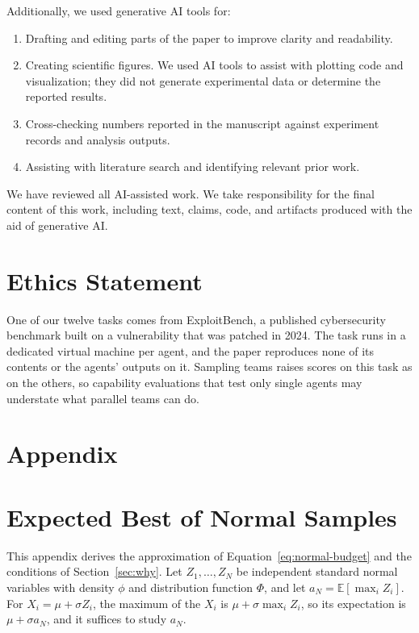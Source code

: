 \documentclass[numbers,10pt]{arxiv}
\begin{document}
Additionally, we used generative AI tools for:
\begin{enumerate}
    \item Drafting and editing parts of the paper to improve clarity and readability.
    \item Creating scientific figures. We used AI tools to assist with plotting code and visualization; they did not generate experimental data or determine the reported results.
    \item Cross-checking numbers reported in the manuscript against experiment records and analysis outputs.
    \item Assisting with literature search and identifying relevant prior work.
\end{enumerate}

We have reviewed all AI-assisted work. We take responsibility for the final content of this work, including text, claims, code, and artifacts produced with the aid of generative AI.

\section*{Ethics Statement}
One of our twelve tasks comes from ExploitBench, a published cybersecurity benchmark built on a vulnerability that was patched in 2024. The task runs in a dedicated virtual machine per agent, and the paper reproduces none of its contents or the agents' outputs on it. Sampling teams raises scores on this task as on the others, so capability evaluations that test only single agents may understate what parallel teams can do.

\FloatBarrier



\clearpage
\appendix
\section*{\Large Appendix}
\section{Expected Best of Normal Samples}
\label{app:normal}
This appendix derives the approximation of Equation~\ref{eq:normal-budget} and the conditions of Section~\ref{sec:why}. Let $Z_1,\dots,Z_N$ be independent standard normal variables with density $\phi$ and distribution function $\Phi$, and let $a_N=\mathbb{E}[\max_i Z_i]$. For $X_i=\mu+\sigma Z_i$, the maximum of the $X_i$ is $\mu+\sigma\max_i Z_i$, so its expectation is $\mu+\sigma a_N$, and it suffices to study $a_N$.
\end{document}
